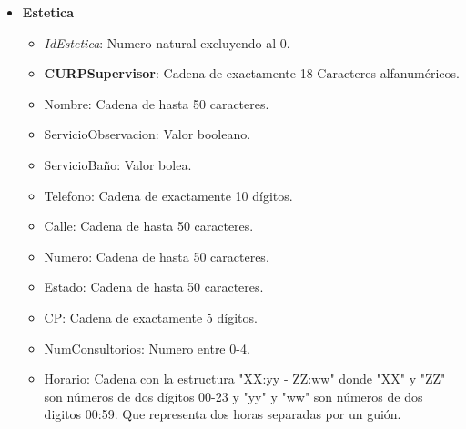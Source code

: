\documentclass{exam}
\begin{document}
\begin{itemize}
	\item \textbf{Estetica}
		\begin{itemize}
			\item \textit{IdEstetica}: Numero natural excluyendo al 0.
			\item \textbf{CURPSupervisor}: Cadena de exactamente 18 Caracteres alfanuméricos.
			\item Nombre: Cadena de hasta 50 caracteres.
			\item ServicioObservacion: Valor booleano.
			\item ServicioBaño: Valor bolea.
			\item Telefono: Cadena de exactamente 10 dígitos.
			\item Calle: Cadena de hasta 50 caracteres.
			\item Numero: Cadena de hasta 50 caracteres.
			\item Estado: Cadena de hasta 50 caracteres.
			\item CP: Cadena de exactamente 5 dígitos.
			\item NumConsultorios: Numero entre 0-4.
			\item Horario: Cadena con la estructura "XX:yy - ZZ:ww" donde "XX" y "ZZ" son números de dos dígitos 00-23 y "yy" y "ww" son números de dos digitos 00:59. Que representa dos horas separadas por un guión.
		\end{itemize}
		

\end{itemize}
\end{document}
